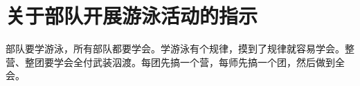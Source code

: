 \section[关于部队开展游泳活动的指示（一九六四年七月二日）]{关于部队开展游泳活动的指示}


部队要学游泳，所有部队都要学会。学游泳有个规律，摸到了规律就容易学会。整营、整团要学会全付武装泅渡。每团先搞一个营，每师先搞一个团，然后做到全会。


